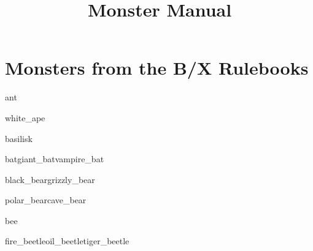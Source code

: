 \documentclass[a4paper,serif]{module}
\begin{document}
\raggedbottom

\title{Monster Manual}

\part{Monsters from the B/X Rulebooks}

\begin{newmonster}{ant}
\lipsum[1]
\end{newmonster}

\begin{newmonster}{white_ape}\end{newmonster}

\begin{newmonster}{basilisk}\end{newmonster}



\begin{newmonster3}{bat}{giant_bat}{vampire_bat}
\lipsum[1]
\end{newmonster3}


\begin{newmonster2}{black_bear}{grizzly_bear}\end{newmonster2}
\begin{newmonster2*}{polar_bear}{cave_bear}{}{}\lipsum[2]\end{newmonster2*}

\begin{newmonster}{bee}\end{newmonster}


\begin{newmonster3}{fire_beetle}{oil_beetle}{tiger_beetle}\lipsum[3]\end{newmonster3}
\end{document}

